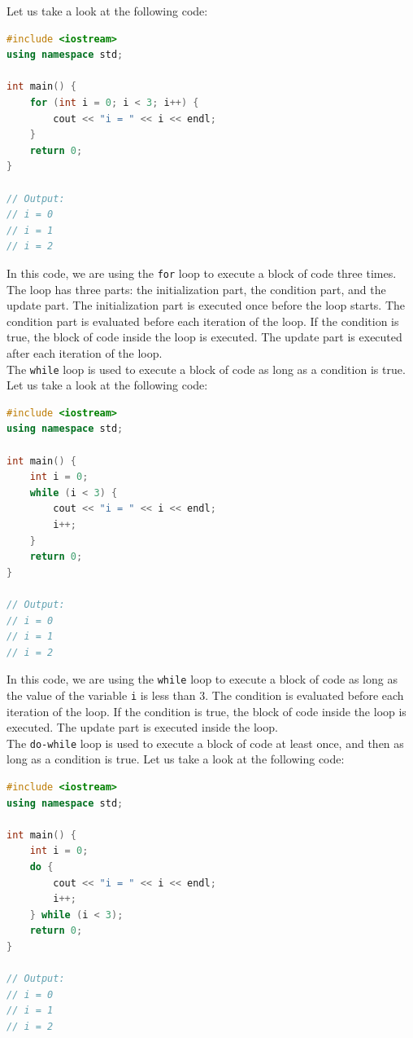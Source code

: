 Let us take a look at the following code:

\begin{lstlisting}[language=C++]
#include <iostream>
using namespace std;

int main() {
    for (int i = 0; i < 3; i++) {
        cout << "i = " << i << endl;
    }
    return 0;
}

// Output:
// i = 0
// i = 1
// i = 2
\end{lstlisting}

In this code, we are using the \texttt{for} loop to execute a block of code three times. The loop has three parts: the
initialization part, the condition part, and the update part. The initialization part is executed once before the loop
starts. The condition part is evaluated before each iteration of the loop. If the condition is true, the block of code
inside the loop is executed. The update part is executed after each iteration of the loop.\\

The \texttt{while} loop is used to execute a block of code as long as a condition is true. Let us take a look at the
following code:

\begin{lstlisting}[language=C++]
#include <iostream>
using namespace std;

int main() {
    int i = 0;
    while (i < 3) {
        cout << "i = " << i << endl;
        i++;
    }
    return 0;
}

// Output:
// i = 0
// i = 1
// i = 2
\end{lstlisting}

In this code, we are using the \texttt{while} loop to execute a block of code as long as the value of the variable \texttt{i}
is less than 3. The condition is evaluated before each iteration of the loop. If the condition is true, the block of code
inside the loop is executed. The update part is executed inside the loop.\\

The \texttt{do-while} loop is used to execute a block of code at least once, and then as long as a condition is true. Let us
take a look at the following code:

\begin{lstlisting}[language=C++]
#include <iostream>
using namespace std;

int main() {
    int i = 0;
    do {
        cout << "i = " << i << endl;
        i++;
    } while (i < 3);
    return 0;
}

// Output:
// i = 0
// i = 1
// i = 2
\end{lstlisting}

